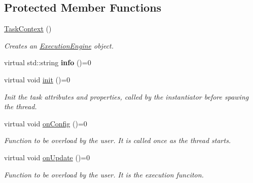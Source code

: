\subsection*{Protected Member Functions}
\begin{DoxyCompactItemize}
\item 
\hypertarget{classcoco_1_1_task_context_a2254f581ed334e5273246e88c05ddfed}{}\hyperlink{classcoco_1_1_task_context_a2254f581ed334e5273246e88c05ddfed}{Task\+Context} ()\label{classcoco_1_1_task_context_a2254f581ed334e5273246e88c05ddfed}

\begin{DoxyCompactList}\small\item\em Creates an \hyperlink{classcoco_1_1_execution_engine}{Execution\+Engine} object. \end{DoxyCompactList}\item 
\hypertarget{classcoco_1_1_task_context_adb443956ebfd96472f7a8ed0e4042054}{}virtual std\+::string {\bfseries info} ()=0\label{classcoco_1_1_task_context_adb443956ebfd96472f7a8ed0e4042054}

\item 
\hypertarget{classcoco_1_1_task_context_a4ac24bd71202d3e87d487dd24d47d9a0}{}virtual void \hyperlink{classcoco_1_1_task_context_a4ac24bd71202d3e87d487dd24d47d9a0}{init} ()=0\label{classcoco_1_1_task_context_a4ac24bd71202d3e87d487dd24d47d9a0}

\begin{DoxyCompactList}\small\item\em Init the task attributes and properties, called by the instantiator before spawing the thread. \end{DoxyCompactList}\item 
\hypertarget{classcoco_1_1_task_context_a397ba5231353db343c71280ca0502459}{}virtual void \hyperlink{classcoco_1_1_task_context_a397ba5231353db343c71280ca0502459}{on\+Config} ()=0\label{classcoco_1_1_task_context_a397ba5231353db343c71280ca0502459}

\begin{DoxyCompactList}\small\item\em Function to be overload by the user. It is called once as the thread starts. \end{DoxyCompactList}\item 
\hypertarget{classcoco_1_1_task_context_a75a4efc25d04977d15bfdd8407d29d07}{}virtual void \hyperlink{classcoco_1_1_task_context_a75a4efc25d04977d15bfdd8407d29d07}{on\+Update} ()=0\label{classcoco_1_1_task_context_a75a4efc25d04977d15bfdd8407d29d07}

\begin{DoxyCompactList}\small\item\em Function to be overload by the user. It is the execution funciton. \end{DoxyCompactList}\end{DoxyCompactItemize}
